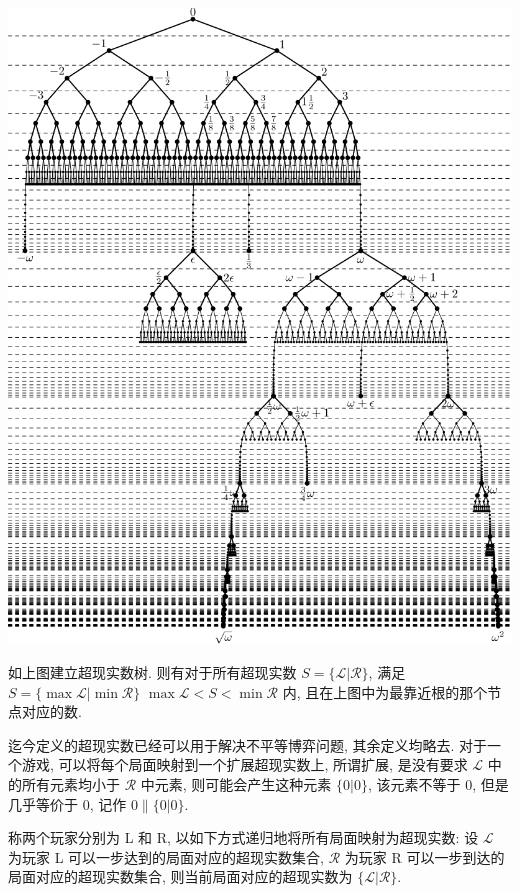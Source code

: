 \begin{center}
  \includegraphics[scale=0.375,natwidth=811,natheight=1024]{CGT/811px-Surreal_number_tree.svg.png}
\end{center}

如上图建立超现实数树. 则有对于所有超现实数 $S=\{\mathcal L|\mathcal R\}$, 满足 $S=\{\max\mathcal L|\min\mathcal R\}$ $\max\mathcal L<S<\min\mathcal R$ 内, 且在上图中为最靠近根的那个节点对应的数.

迄今定义的超现实数已经可以用于解决不平等博弈问题, 其余定义均略去. 对于一个游戏, 可以将每个局面映射到一个扩展超现实数上, 所谓扩展, 是没有要求 $\mathcal L$ 中的所有元素均小于 $\mathcal R$ 中元素, 则可能会产生这种元素 $\{0|0\}$, 该元素不等于 0, 但是几乎等价于 0, 记作 $0\parallel\{0|0\}$.

称两个玩家分别为 L 和 R, 以如下方式递归地将所有局面映射为超现实数: 设 $\mathcal L$ 为玩家 L 可以一步达到的局面对应的超现实数集合, $\mathcal R$ 为玩家 R 可以一步到达的局面对应的超现实数集合, 则当前局面对应的超现实数为 $\{\mathcal L|\mathcal R\}$.

